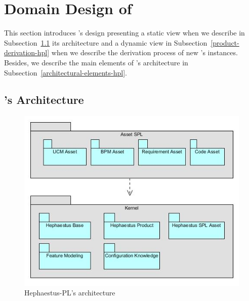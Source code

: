 
\section{Domain Design of \hpl}
\label{sec:domainDesign}

This section introduces \hpl's design presenting a static view when we describe in Subsection~\ref{architectural-view-hpl} its architecture and a dynamic view in Subsection~\ref{product-derivation-hpl} when we describe the derivation process of new \hpl's instances. Besides, we describe the main elements of \hpl's architecture in Subsection~\ref{architectural-elements-hpl}.


\subsection{\hpl's Architecture} \label{architectural-view-hpl}

%
%



\begin{figure}[bth]
\begin{center}
\includegraphics[scale=0.5]{imagens/architecture-hpl-vf.jpg}
\end{center}
\caption{Hephaestus-PL's architecture}
\label{fig:architecture-hpl}
\end{figure}

